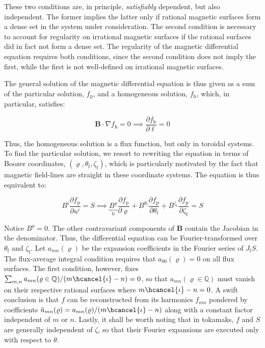 These two conditions are, in principle, \textit{satisfiably} dependent, but also independent. The former implies the latter only if rational magnetic surfaces form a dense set in the system under consideration. The second condition is necessary to account for regularity on irrational magnetic surfaces if the rational surfaces did in fact not form a dense set. The regularity of the magnetic differential equation requires both conditions, since the second condition does not imply the first, while the first is not well-defined on irrational magnetic surfaces.

\quad The general solution of the magnetic differential equation is thus given as a sum of the particular solution, $f_\text{p}$, and a homogeneous solution, $f_\text{h}$, which, in particular, satisfies:

\begin{equation}
    \mathbf{B}\cdot\nabla f_\text{h}=0\implies\frac{\partial f_\text{h}}{\partial\ell}=0
\end{equation}

Thus, the homogeneous solution is a flux function, but only in toroidal systems. To find the particular solution, we resort to rewriting the equation in terms of Boozer coordinates, $(\varrho, \theta_\text{f}, \zeta_\text{f})$, which is particularly motivated by the fact that magnetic field-lines are straight in these coordinate systems. The equation is thus equivalent to:

\begin{equation}
    B^i\frac{\partial f_\text{p}}{\partial u^i}=S\implies\underbrace{B^\varrho}_{0}\frac{\partial f_\text{p}}{\partial\varrho}+B^{\theta_\text{f}}\frac{\partial f_\text{p}}{\partial\theta_\text{f}}+B^{\zeta_\text{f}}\frac{\partial f_\text{p}}{\partial\zeta_\text{f}}=S
\end{equation}

Notice $B^\varrho=0$. The other contravariant components of $\mathbf{B}$ contain the Jacobian in the denominator. Thus, the differential equation can be Fourier-transformed over $\theta_\text{f}$ and $\zeta_\text{f}$. Let $a_{mn}(\varrho)$ be the expansion coefficients in the Fourier series of $J_\text{f}S$. The flux-average integral condition requires that $a_{00}(\varrho)=0$ on all flux surfaces. The first condition, however, fixes $\sum_{m,n}a_{mn}(\varrho\in\mathbb{Q})/(m\hcancel{\iota}-n)=0$, so that $a_{mn}(\varrho\in\mathbb{Q})$ must vanish on their respective rational surfaces where $m\hcancel{\iota}-n=0$. A swift conclusion is that $f$ can be reconstructed from its harmonics $f_{mn}$ pondered by coefficients $\Tilde{a}_{mn}(\varrho)=a_{mn}(\varrho)/(m\hcancel{\iota}-n)$ along with a constant factor independent of $m$ or $n$. Lastly, it shall be worth noting that in tokamaks, $f$ and $S$ are generally independent of $\zeta$, so that their Fourier expansions are executed only with respect to $\theta$.

